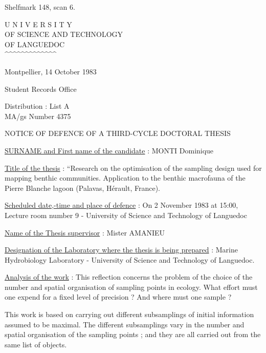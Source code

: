 Shelfmark 148, scan 6.


\begin{center}
U N I V E R S I T Y\\
OF SCIENCE AND TECHNOLOGY\\
OF LANGUEDOC\\
\textasciicircum\textasciicircum\textasciicircum\textasciicircum\textasciicircum\textasciicircum\textasciicircum\textasciicircum\textasciicircum\textasciicircum\textasciicircum\textasciicircum\textasciicircum
\end{center}

Montpellier, 14 October 1983

Student Records Office

Distribution : List A\\
MA/gs \hfill Number 4375

\begin{center}
NOTICE OF DEFENCE OF A THIRD-CYCLE DOCTORAL THESIS

\end{center}

\uline{SURNAME and First name of the candidate} : MONTI Dominique

\uline{Title of the thesis} : ``Research on the optimisation of the sampling design used for mapping benthic communities. Application to the benthic macrofauna of the Pierre Blanche lagoon (Palavas, Hérault, France).

\uline{Scheduled date,-time and place of defence} : On 2 November 1983 at 15:00,\\
Lecture room number 9 - University of Science and Technology of Languedoc

\uline{Name of the Thesis supervisor} : Mister AMANIEU

\uline{Designation of the Laboratory where the thesis is being prepared} : Marine Hydrobiology Laboratory - University of Science and Technology of Languedoc.

\uline{Analysis of the work} : This reflection concerns the problem of the choice of the number and spatial organisation of sampling points in ecology. What effort must one expend for a fixed level of precision ? And where must one sample ?

This work is based on carrying out different subsamplings of initial information assumed to be maximal. The different subsamplings vary in the number and spatial organisation of the sampling points ; and they are all carried out from the same list of objects.

